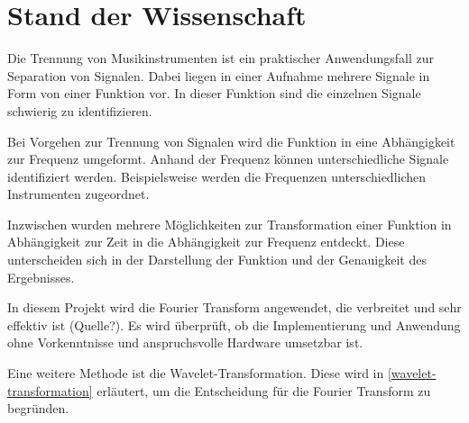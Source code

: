 \chapter{Stand der Wissenschaft}
\label{stand_der_wissenschaft}

Die Trennung von Musikinstrumenten ist ein praktischer Anwendungsfall zur Separation von Signalen. Dabei liegen in einer Aufnahme mehrere Signale in Form von einer Funktion vor. In dieser Funktion sind die einzelnen Signale schwierig zu identifizieren.

\par

Bei Vorgehen zur Trennung von Signalen wird die Funktion in eine Abhängigkeit zur Frequenz umgeformt. Anhand der Frequenz können unterschiedliche Signale identifiziert werden. Beispielsweise werden die Frequenzen unterschiedlichen Instrumenten zugeordnet.

\par

Inzwischen wurden mehrere Möglichkeiten zur Transformation einer Funktion in Abhängigkeit zur Zeit in die Abhängigkeit zur Frequenz entdeckt. Diese unterscheiden sich in der Darstellung der Funktion und der Genauigkeit des Ergebnisses.

\par

In diesem Projekt wird die Fourier Transform angewendet, die verbreitet und sehr effektiv ist (Quelle?). Es wird überprüft, ob die Implementierung und Anwendung ohne Vorkenntnisse und anspruchsvolle Hardware umsetzbar ist.

\par

Eine weitere Methode ist die Wavelet-Transformation. Diese wird in \cref{wavelet-transformation} erläutert, um die Entscheidung für die Fourier Transform zu begründen.



